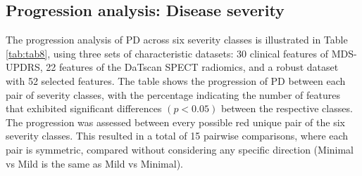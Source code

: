 \documentclass{article}
\begin{document}
\subsection{Progression analysis: Disease severity}
The progression analysis of PD across six severity classes is illustrated in Table \ref{tab:tab8}, using three sets of characteristic datasets: 30 clinical features of MDS-UPDRS, 22 features of the DaTscan SPECT radiomics, and a robust dataset with 52 selected features. The table shows the progression of PD between each pair of severity classes, with the percentage indicating the number of features that exhibited significant differences $(p < 0.05)$ between the respective classes. The progression was assessed between every possible red unique pair of the six severity classes. This resulted in a total of 15 pairwise comparisons, where each pair is symmetric, compared without considering any specific direction (Minimal vs Mild is the same as Mild vs Minimal).

\begin{table}[ht!]
    \centering
    \caption{Progression between each pair of patient visits} 
    \label{tab:tab9}
    \renewcommand{\arraystretch}{1.5} 
\end{table}
\end{document}
